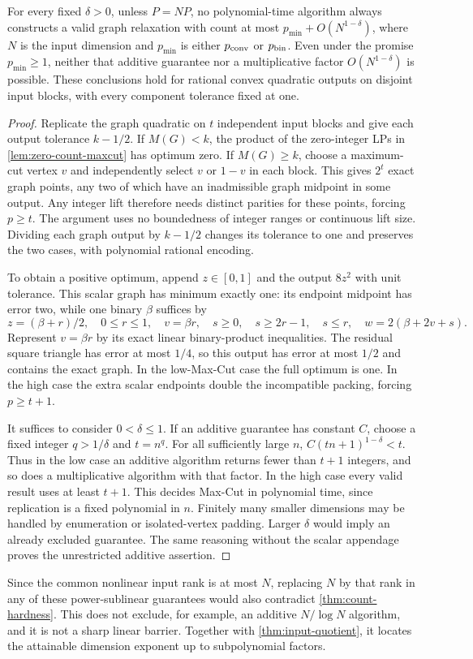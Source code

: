 \begin{theorem}\label{thm:count-hardness}
For every fixed $\delta>0$, unless $P=NP$, no polynomial-time algorithm
always constructs a valid graph relaxation with count at most
$p_{\min}+O(N^{1-\delta})$, where $N$ is the input dimension and
$p_{\min}$ is either $p_{\mathrm{conv}}$ or $p_{\mathrm{bin}}$. Even under the promise
$p_{\min}\ge1$, neither that additive guarantee nor a multiplicative
factor $O(N^{1-\delta})$ is possible. These conclusions hold for
rational convex quadratic outputs on disjoint input blocks, with every
component tolerance fixed at one.
\end{theorem}
\begin{proof}
Replicate the graph quadratic on $t$ independent input blocks and give
each output tolerance $k-1/2$. If $M(G)<k$, the product of the zero-integer
LPs in \cref{lem:zero-count-maxcut} has optimum zero. If $M(G)\ge k$,
choose a maximum-cut vertex $v$ and independently select $v$ or $1-v$
in each block. This gives $2^t$ exact graph points, any two of which
have an inadmissible graph midpoint in some output. Any integer lift
therefore needs distinct parities for these points, forcing $p\ge t$.
The argument uses no boundedness of integer ranges or continuous lift
size. Dividing each graph output by $k-1/2$ changes its tolerance to
one and preserves the two cases, with polynomial rational encoding.

To obtain a positive optimum, append $z\in[0,1]$ and the output $8z^2$
with unit tolerance. This scalar graph has minimum exactly one: its
endpoint midpoint has error two, while one binary $\beta$ suffices by
\[
 z=(\beta+r)/2,\quad 0\le r\le1,\quad v=\beta r,
 \quad s\ge0,\quad s\ge2r-1,\quad s\le r,
 \quad w=2(\beta+2v+s).
\]
Represent $v=\beta r$ by its exact linear binary-product inequalities.
The residual square triangle has error at most $1/4$, so this output
has error at most $1/2$ and contains the exact graph. In the low-Max-Cut
case the full optimum is one. In the high case the extra scalar endpoints
double the incompatible packing, forcing $p\ge t+1$.

It suffices to consider $0<\delta\le1$. If an additive guarantee has
constant $C$, choose a fixed integer $q>1/\delta$ and $t=n^q$.
For all sufficiently large $n$,
$C(tn+1)^{1-\delta}<t$. Thus in the low case an additive algorithm
returns fewer than $t+1$ integers, and so does a multiplicative algorithm
with that factor. In the high case every valid result uses at least
$t+1$. This decides Max-Cut in polynomial time, since replication is
a fixed polynomial in $n$. Finitely many smaller dimensions may be
handled by enumeration or isolated-vertex padding. Larger $\delta$
would imply an already excluded guarantee. The same reasoning without
the scalar appendage proves the unrestricted additive assertion.
\end{proof}

Since the common nonlinear input rank is at most $N$, replacing $N$
by that rank in any of these power-sublinear guarantees would also
contradict \cref{thm:count-hardness}. This does not exclude, for example,
an additive $N/\log N$ algorithm, and it is not a sharp linear barrier.
Together with \cref{thm:input-quotient}, it locates the attainable
dimension exponent up to subpolynomial factors.
